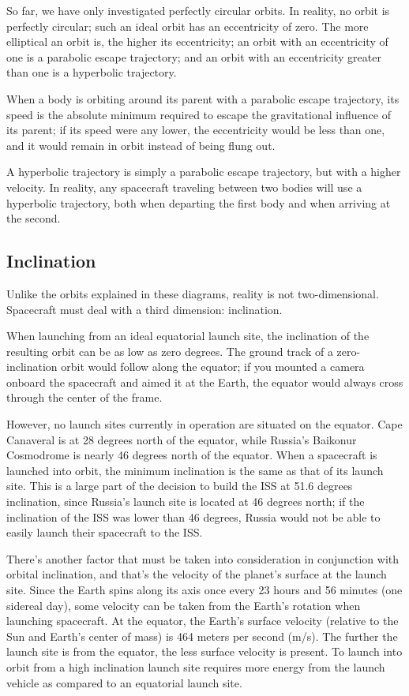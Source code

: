 So far, we have only investigated perfectly circular orbits. In
reality, no orbit is perfectly circular; such an ideal orbit has an
eccentricity of zero. The more elliptical an orbit is, the higher its
eccentricity; an orbit with an eccentricity of one is a parabolic
escape trajectory; and an orbit with an eccentricity greater than one
is a hyperbolic trajectory.


When a body is orbiting around its parent with a parabolic escape
trajectory, its speed is the absolute minimum required to escape the
gravitational influence of its parent; if its speed were any lower,
the eccentricity would be less than one, and it would remain in orbit
instead of being flung out.

A hyperbolic trajectory is simply a parabolic escape trajectory, but
with a higher velocity. In reality, any spacecraft traveling between
two bodies will use a hyperbolic trajectory, both when departing the
first body and when arriving at the second.

\subsection{Inclination}

Unlike the orbits explained in these diagrams, reality is not
two-dimensional. Spacecraft must deal with a third dimension:
inclination.

When launching from an ideal equatorial launch site, the inclination
of the resulting orbit can be as low as zero degrees. The ground track
of a zero-inclination orbit would follow along the equator; if you
mounted a camera onboard the spacecraft and aimed it at the Earth, the
equator would always cross through the center of the frame.


However, no launch sites currently in operation are situated on the
equator. Cape Canaveral is at 28 degrees north of the equator, while
Russia's Baikonur Cosmodrome is nearly 46 degrees north of the
equator. When a spacecraft is launched into orbit, the minimum
inclination is the same as that of its launch site. This is a large
part of the decision to build the ISS at 51.6 degrees inclination,
since Russia's launch site is located at 46 degrees north; if the
inclination of the ISS was lower than 46 degrees, Russia would not be
able to easily launch their spacecraft to the ISS.

There's another factor that must be taken into consideration in
conjunction with orbital inclination, and that's the velocity of the
planet's surface at the launch site. Since the Earth spins along its
axis once every 23 hours and 56 minutes (one sidereal day), some
velocity can be taken from the Earth's rotation when launching
spacecraft. At the equator, the Earth's surface velocity (relative to
the Sun and Earth's center of mass) is 464 meters per second
(m/s). The further the launch site is from the equator, the less
surface velocity is present. To launch into orbit from a high
inclination launch site requires more energy from the launch vehicle
as compared to an equatorial launch site.

